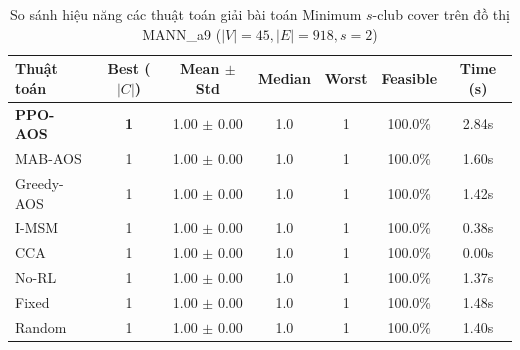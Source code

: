 \begin{table}[htbp]
\centering
\caption{So sánh hiệu năng các thuật toán giải bài toán Minimum $s$-club cover trên đồ thị MANN_a9 ($|V|=45, |E|=918, s=2$)}
\label{tab:results_MANN_a9}
\begin{tabular}{lcccccc}
\hline
\textbf{Thuật toán} & \textbf{Best ($|C|$)} & \textbf{Mean $\pm$ Std} & \textbf{Median} & \textbf{Worst} & \textbf{Feasible} & \textbf{Time (s)} \\
\hline
\textbf{PPO-AOS} & \textbf{1} & 1.00 $\pm$ 0.00 & 1.0 & 1 & 100.0\% & 2.84s \\
MAB-AOS & 1 & 1.00 $\pm$ 0.00 & 1.0 & 1 & 100.0\% & 1.60s \\
Greedy-AOS & 1 & 1.00 $\pm$ 0.00 & 1.0 & 1 & 100.0\% & 1.42s \\
I-MSM & 1 & 1.00 $\pm$ 0.00 & 1.0 & 1 & 100.0\% & 0.38s \\
CCA & 1 & 1.00 $\pm$ 0.00 & 1.0 & 1 & 100.0\% & 0.00s \\
No-RL & 1 & 1.00 $\pm$ 0.00 & 1.0 & 1 & 100.0\% & 1.37s \\
Fixed & 1 & 1.00 $\pm$ 0.00 & 1.0 & 1 & 100.0\% & 1.48s \\
Random & 1 & 1.00 $\pm$ 0.00 & 1.0 & 1 & 100.0\% & 1.40s \\
\hline
\end{tabular}
\end{table}
